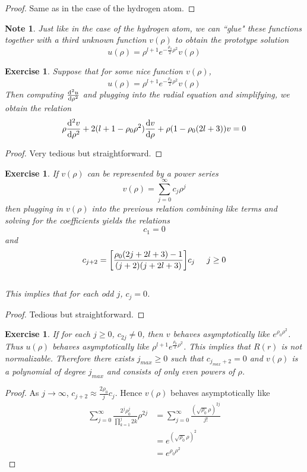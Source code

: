 \documentclass[12pt]{amsart}
\newtheorem{note}[thm]{Note}
\newtheorem{ex}[thm]{Exercise}
\begin{document}
\begin{proof}
Same as in the case of the hydrogen atom.
\end{proof}

\begin{note}
Just like in the case of the hydrogen atom, we can ``glue" these functions together with a third unknown function $v(\rho)$ to obtain the prototype solution $$u(\rho) = \rho^{l+1}e^{-\frac{\rho_0}{2}\rho^2}v(\rho)$$
\end{note}

\begin{ex}
Suppose that for some nice function $v(\rho)$, $$u(\rho) = \rho^{l+1}e^{-\frac{\rho_0}{2}\rho^2}v(\rho)$$ Then computing $\dv[2]{u}{\rho}$ and plugging into the radial equation and simplifying, we obtain the relation $$\rho \dv[2]{v}{\rho} +2(l+1 - \rho_0\rho^2)\dv{v}{\rho} + \rho(1-\rho_0(2l+3))v = 0$$
\end{ex}

\begin{proof}
Very tedious but straightforward.
\end{proof}

\begin{ex}
If $v(\rho)$ can be represented by a power series $$v(\rho) = \sum_{j=0}^{\infty}c_j\rho^j$$ then plugging in $v(\rho)$ into the previous relation combining like terms and solving for the coefficients yields the relations $$c_1 = 0$$ and $$c_{j+2} = \bigg[ \frac{\rho_0(2j+2l+3)-1}{(j+2)(j+2l+3)}\bigg]c_j \hspace{5mm} j \geq 0$$ \vspace{3mm} \\This implies that for each odd $j$, $c_j = 0$. \vspace{3mm}
\end{ex}

\begin{proof}
Tedious but straightforward.
\end{proof}

\begin{ex}
If for each $j \geq 0$, $c_{2j} \neq 0$, then $v$ behaves asymptotically like $e^{\rho_0\rho^2}$. Thus $u(\rho)$ behaves asymptotically like $\rho^{l+1}e^{\frac{\rho_0}{2}\rho^2}$. This implies that $R(r)$ is not normalizable. Therefore there exists $j_{max} \geq 0$ such that $c_{j_{max}+2} = 0$ and $v(\rho)$ is a polynomial of degree $j_{max}$ and consists of only even powers of $\rho$. 
\end{ex}

\begin{proof}
As $j \rightarrow \infty$, $c_{j+2} \approx \frac{2 \rho_0}{j}c_j$. Hence $v(\rho)$ behaves asymptotically like 
\begin{align*}
\sum_{j=0}^{\infty}\frac{2^j\rho_0^j}{\prod_{k=1}^j2k}\rho^{2j}
&= \sum_{j=0}^{\infty}\frac{(\sqrt{\rho_0} \rho)^{2j}}{j!}\\
&= e^{(\sqrt{\rho_0}\rho)^2}\\
&= e^{\rho_0 \rho^2}
\end{align*}
\end{proof}
\end{document}
